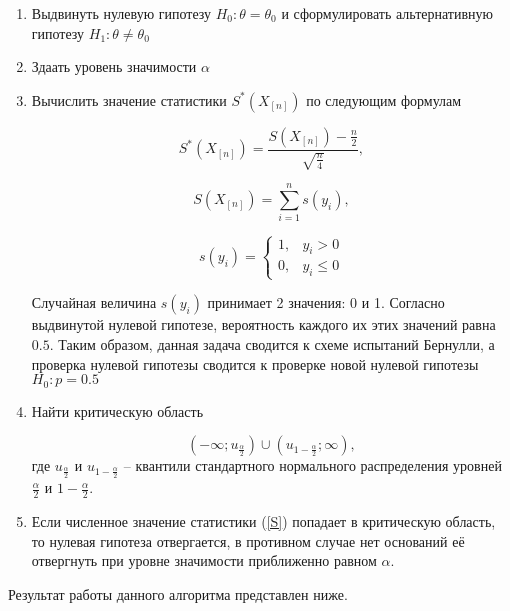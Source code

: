 \begin{enumerate}
	\item Выдвинуть нулевую гипотезу $H_0: \theta = \theta_0$ и сформулировать альтернативную гипотезу $H_1: \theta \ne \theta_0$
	\item Здаать уровень значимости $\alpha$
	\item Вычислить значение статистики $S^*(X_{[n]})$ по следующим формулам
	
	\begin{equation}\label{S}
		S^*(X_{[n]}) = \frac{S(X_{[n]}) - \frac{n}{2}}{\sqrt{\frac{n}{4}}},
	\end{equation}

	\begin{equation}
		S(X_{[n]}) = \sum\limits_{i=1}^n s(y_i),
	\end{equation}

	\begin{equation}
		s(y_i) = \left\{
		\begin{matrix}
			1, & y_i > 0 \\
			0, & y_i \leq 0
		\end{matrix}
		\right.
	\end{equation}
	
	Случайная величина $s(y_i)$ принимает 2 значения: 0 и 1. Согласно выдвинутой нулевой гипотезе, вероятность каждого их этих значений равна $0.5$. Таким образом, данная задача сводится к схеме испытаний Бернулли, а проверка нулевой гипотезы сводится к проверке новой нулевой гипотезы $H_0: p = 0.5$
	
	\item Найти критическую область
	
	\begin{equation}
		\left(-\infty; u_{\frac{\alpha}{2}} \right) \cup \left(u_{1 - \frac{\alpha}{2}}; \infty \right),
	\end{equation}
	где $u_{\frac{\alpha}{2}}$ и $u_{1 - \frac{\alpha}{2}}$ -- квантили стандартного нормального распределения уровней $\frac{\alpha}{2}$ и $1 - \frac{\alpha}{2}$.
	
	\item Если численное значение статистики (\ref{S}) попадает в критическую область, то нулевая гипотеза отвергается, в противном случае нет оснований её отвергнуть при уровне значимости приближенно равном $\alpha$.
	
\end{enumerate}

Результат работы данного алгоритма представлен ниже.

